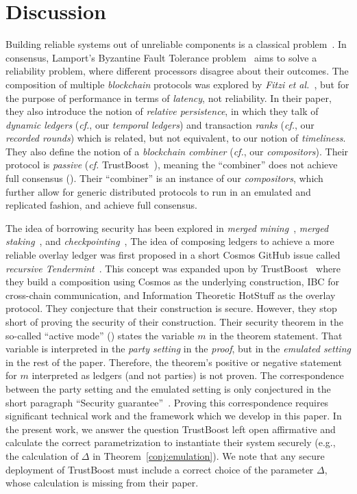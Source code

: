 \section{Discussion}

Building reliable systems out of unreliable components
is a classical problem~\cite{von1956probabilistic,moore1956reliable}.
In consensus, Lamport's Byzantine Fault Tolerance problem~\cite{shostak1982byzantine}
aims to solve a reliability problem, where different processors disagree about their
outcomes. The composition of multiple \emph{blockchain} protocols was explored by
\emph{Fitzi et al.}~\cite{combiners}, but for the purpose of performance in terms of
\emph{latency}, not reliability. In their paper, they also introduce the notion of
\emph{relative persistence}, in which they talk of \emph{dynamic ledgers} (\emph{cf.}, our
\emph{temporal ledgers}) and transaction \emph{ranks} (\emph{cf.}, our \emph{recorded rounds})
which is related, but not equivalent, to our notion of \emph{timeliness}.
They also define the notion of a \emph{blockchain combiner} (\emph{cf.}, our \emph{compositors}).
Their protocol is \emph{passive} (\emph{cf.} TrustBoost~\cite{trustboost}),
meaning the ``combiner'' does not achieve full consensus (\cite[Section 5]{combiners}).
Their ``combiner'' is an instance of our \emph{compositors}, which
further allow for generic distributed protocols to run in an emulated and
replicated fashion, and achieve full consensus.

The idea of borrowing security has been explored in \emph{merged mining}~\cite{namecoin},
\emph{merged staking}~\cite{pos-sidechains}, and
\emph{checkpointing}~\cite{karakostas2021securing},
The idea of composing ledgers to achieve a more reliable overlay ledger
was first proposed in a short Cosmos GitHub issue called
\emph{recursive Tendermint}~\cite{recursive-tendermint}.
This concept was expanded upon by TrustBoost~\cite{trustboost}
where they build a composition using Cosmos as the underlying
construction, IBC for cross-chain communication, and Information Theoretic
HotStuff as the overlay protocol. They conjecture that their construction
is secure. However, they stop short of proving the security of their construction.
Their security theorem in the so-called ``active mode'' (\cite[Theorem 2]{trustboost})
states the variable $m$ in the theorem statement. That variable is
interpreted in the \emph{party setting} in the \emph{proof}, but in the \emph{emulated setting}
in the rest of the paper. Therefore, the theorem's positive or negative statement
for $m$ interpreted as ledgers (and not parties) is not proven.
The correspondence between the party setting and the emulated setting is
only conjectured in the short paragraph ``Security guarantee''~\cite[Section 4.1]{trustboost}.
Proving this correspondence requires significant technical work and the framework
which we develop in this paper.
In the present work, we
answer the question TrustBoost left open affirmative and calculate the correct
parametrization to instantiate their system securely (e.g., the calculation
of $\Delta$ in Theorem~\ref{conj:emulation}). We note that any secure
deployment of TrustBoost must include a correct choice of the parameter $\Delta$,
whose calculation is missing from their paper.

